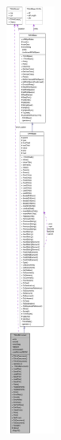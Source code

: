 \begin{figure}[H]
\begin{center}
\leavevmode
\includegraphics[height=400pt]{class_ti_xml_document__coll__graph}
\end{center}
\end{figure}
